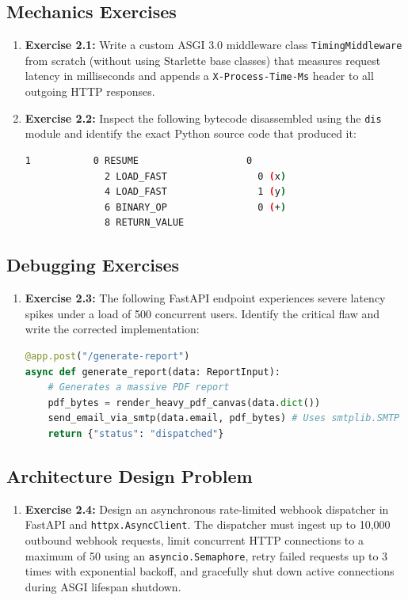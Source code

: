 \subsection{Mechanics Exercises}
\begin{enumerate}
  \item \textbf{Exercise 2.1:} Write a custom ASGI 3.0 middleware class \texttt{TimingMiddleware} from scratch (without using Starlette base classes) that measures request latency in milliseconds and appends a \texttt{X-Process-Time-Ms} header to all outgoing HTTP responses.
  \item \textbf{Exercise 2.2:} Inspect the following bytecode disassembled using the \texttt{dis} module and identify the exact Python source code that produced it:
\begin{lstlisting}[language=sh]
  1           0 RESUME                   0
              2 LOAD_FAST                0 (x)
              4 LOAD_FAST                1 (y)
              6 BINARY_OP                0 (+)
              8 RETURN_VALUE
\end{lstlisting}
\end{enumerate}

\subsection{Debugging Exercises}
\begin{enumerate}
  \item \textbf{Exercise 2.3:} The following FastAPI endpoint experiences severe latency spikes under a load of 500 concurrent users. Identify the critical flaw and write the corrected implementation:
\begin{lstlisting}[language=Python]
@app.post("/generate-report")
async def generate_report(data: ReportInput):
    # Generates a massive PDF report
    pdf_bytes = render_heavy_pdf_canvas(data.dict())
    send_email_via_smtp(data.email, pdf_bytes) # Uses smtplib.SMTP
    return {"status": "dispatched"}
\end{lstlisting}
\end{enumerate}

\subsection{Architecture Design Problem}
\begin{enumerate}
  \item \textbf{Exercise 2.4:} Design an asynchronous rate-limited webhook dispatcher in FastAPI and \texttt{httpx.AsyncClient}. The dispatcher must ingest up to 10,000 outbound webhook requests, limit concurrent HTTP connections to a maximum of 50 using an \texttt{asyncio.Semaphore}, retry failed requests up to 3 times with exponential backoff, and gracefully shut down active connections during ASGI lifespan shutdown.
\end{enumerate}

